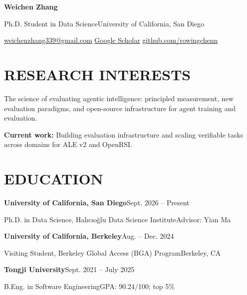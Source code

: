 \documentclass[10pt,letterpaper]{article}
\newcommand{\entry}[4]{%
  \textbf{#1}\hfill{\small #2}\par
  {\small #3\hfill\textcolor{muted}{#4}}\par}
\newcommand{\sep}{\enspace\textcolor{muted}{\textbar}\enspace}
\begin{document}
{\fontsize{25}{28}\selectfont\bfseries Weichen Zhang}\par
\vspace{4pt}
Ph.D. Student in Data Science\sep University of California, San Diego\par
\vspace{3pt}
{\small
\href{mailto:weichenzhang339@gmail.com}{weichenzhang339@gmail.com}\sep
\href{https://scholar.google.com/citations?user=5BgyLQ8AAAAJ&hl=en}{Google Scholar}\sep
\href{https://github.com/rowingchenn}{github.com/rowingchenn}}

\section{RESEARCH INTERESTS}
The science of evaluating agentic intelligence: principled measurement, new evaluation paradigms, and open-source infrastructure for agent training and evaluation.
\par\vspace{3pt}
\textbf{Current work:} Building evaluation infrastructure and scaling verifiable tasks across domains for ALE v2 and OpenRSI.

\section{EDUCATION}
\entry{University of California, San Diego}{Sept. 2026 -- Present}
  {Ph.D. in Data Science, Hal\i c\i o\u glu Data Science Institute}{Advisor: Yian Ma}
\vspace{4pt}
\entry{University of California, Berkeley}{Aug. -- Dec. 2024}
  {Visiting Student, Berkeley Global Access (BGA) Program}{Berkeley, CA}
\vspace{4pt}
\entry{Tongji University}{Sept. 2021 -- July 2025}
  {B.Eng. in Software Engineering}{GPA: 90.24/100; top 5\%}
\end{document}
